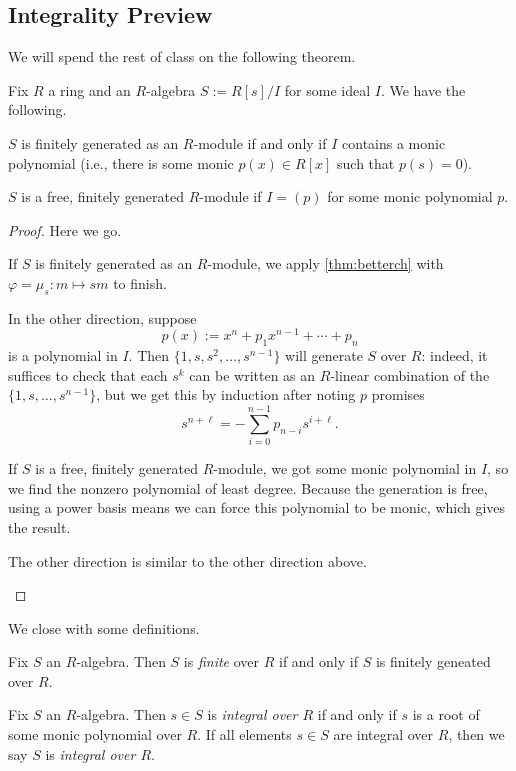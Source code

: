 \subsection{Integrality Preview}
We will spend the rest of class on the following theorem.
\begin{prop}
	Fix $R$ a ring and an $R$-algebra $S:=R[s]/I$ for some ideal $I$. We have the following.
	\begin{listalph}
		\item $S$ is finitely generated as an $R$-module if and only if $I$ contains a monic polynomial (i.e., there is some monic $p(x)\in R[x]$ such that $p(s)=0$).
		\item $S$ is a free, finitely generated $R$-module if $I=(p)$ for some monic polynomial $p$.
	\end{listalph}
\end{prop}
\begin{proof}
	Here we go.
	\begin{listalph}
		\item If $S$ is finitely generated as an $R$-module, we apply \autoref{thm:betterch} with $\varphi=\mu_s:m\mapsto sm$ to finish.

		In the other direction, suppose
		\[p(x):=x^n+p_1x^{n-1}+\cdots+p_n\]
		is a polynomial in $I$. Then $\{1,s,s^2,\ldots,s^{n-1}\}$ will generate $S$ over $R$: indeed, it suffices to check that each $s^k$ can be written as an $R$-linear combination of the $\{1,s,\ldots,s^{n-1}\}$, but we get this by induction after noting $p$ promises
		\[s^{n+\ell}=-\sum_{i=0}^{n-1}p_{n-i}s^{i+\ell}.\]

		\item If $S$ is a free, finitely generated $R$-module, we got some monic polynomial in $I$, so we find the nonzero polynomial of least degree. Because the generation is free, using a power basis means we can force this polynomial to be monic, which gives the result.

		The other direction is similar to the other direction above.
		\qedhere
	\end{listalph}
\end{proof}
We close with some definitions.
\begin{definition}[Finite]
	Fix $S$ an $R$-algebra. Then $S$ is \textit{finite} over $R$ if and only if $S$ is finitely geneated over $R$.
\end{definition}
\begin{definition}[Integral]
	Fix $S$ an $R$-algebra. Then $s\in S$ is \textit{integral over $R$} if and only if $s$ is a root of some monic polynomial over $R$. If all elements $s\in S$ are integral over $R$, then we say $S$ is \textit{integral over $R$}.
\end{definition}